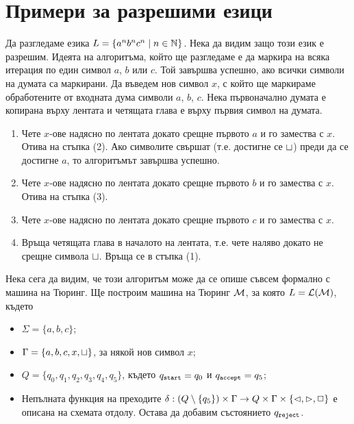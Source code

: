 \section{Примери за разрешими езици}
\label{sect:turing:examples}

\begin{example}
  Да разгледаме езика $L = \{a^nb^nc^n \mid n\in\mathbb{N}\}$.
  Нека да видим защо този език е разрешим.
  Идеята на алгоритъма, който ще разгледаме е да маркира на всяка итерация по един символ $a$, $b$ или $c$.
  Той завършва успешно, ако всички символи на думата са маркирани.
  Да въведем нов символ $x$, с който ще маркираме обработените от входната дума символи $a$, $b$, $c$.
  Нека първоначално думата е копирана върху лентата и четящата глава е върху първия символ на думата.
  \begin{enumerate}[(1)]
  \item 
    Чете $x$-ове надясно по лентата докато срещне първото $a$ и го замества с $x$. Отива на стъпка (2).
    Ако символите свършат (т.е. достигне се $\sqcup$) преди да се достигне $a$,
    то алгоритъмът завършва успешно.
  \item
    Чете $x$-ове надясно по лентата докато срещне първото $b$ и го замества с $x$.
    Отива на стъпка (3).
  \item
    Чете $x$-ове надясно по лентата докато срещне първото $c$ и го замества с $x$.
  \item
    Връща четящата глава в началото на лентата, т.е. чете наляво докато не срещне символа $\sqcup$.
    Връща се в стъпка (1). 
  \end{enumerate}

  Нека сега да видим, че този алгоритъм може да се опише съвсем формално с машина на Тюринг.
  Ще построим машина на Тюринг $\mathcal{M}$, за която $L = \mathcal{L}(\mathcal{M})$, където
  \begin{itemize}
  \item 
    $\Sigma = \{a,b,c\}$;
  \item
    $\Gamma = \{a,b,c,x,\sqcup\}$, за някой нов символ $x$;
  \item
    $Q = \{q_0,q_1,q_2,q_3,q_4,q_5\}$, където $q_{\texttt{start}} = q_0$ и $q_{\texttt{accept}} = q_5$;
  \item
    Непълната функция на преходите $\delta:(Q\setminus\{q_5\})\times\Gamma \to Q\times\Gamma\times\{\lhd,\rhd,\Box\}$
    е описана на схемата отдолу. Остава да добавим състоянието $q_{\texttt{reject}}$.
  \end{itemize}


\end{example}
